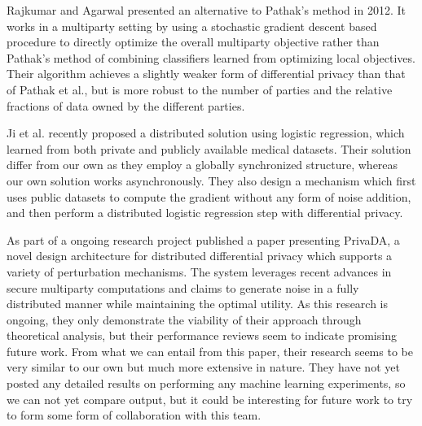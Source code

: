 Rajkumar and Agarwal \citep{rajkumar2012differentially} presented an alternative to Pathak's method in 2012. It works in a multiparty setting by using a stochastic gradient descent based procedure to directly optimize the overall multiparty objective rather than Pathak's method of combining classifiers learned from optimizing local objectives. Their algorithm achieves a slightly weaker form of differential privacy than that of Pathak et al., but is more robust to the number of parties and the relative fractions of data owned by the different parties.

Ji et al. \citep{ji2014DisLogReg} recently proposed a distributed solution using logistic regression, which learned from both private and publicly available medical datasets. Their solution differ from our own as they employ a globally synchronized structure, whereas our own solution works asynchronously. They also design a mechanism which first uses public datasets to compute the gradient without any form of noise addition, and then perform a distributed logistic regression step with differential privacy. 

As part of a ongoing research project \cite{eigner2014privada} published a paper presenting PrivaDA, a novel design architecture for distributed differential privacy which supports a variety of perturbation mechanisms. The system leverages recent advances in secure multiparty computations and claims to generate noise in a fully distributed manner while maintaining the optimal utility. As this research is ongoing, they only demonstrate the viability of their approach through theoretical analysis, but their performance reviews seem to indicate promising future work. From what we can entail from this paper, their research seems to be very similar to our own but much more extensive in nature. They have not yet posted any detailed results on performing any machine learning experiments, so we can not yet compare output, but it could be interesting for future work to try to form some form of collaboration with this team. 


